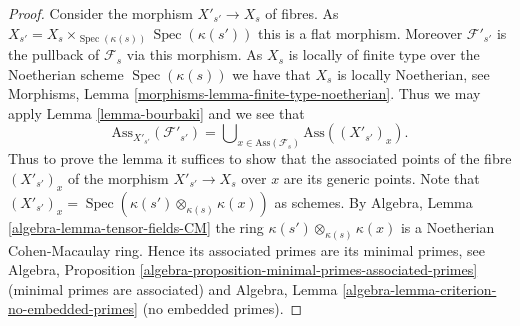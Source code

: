 \documentclass[10pt,a4paper]{amsart}
\theoremstyle{plain}
\theoremstyle{definition}
\theoremstyle{remark}
\numberwithin{equation}{subsection}
\def\Spec{\mathop{\mathrm{Spec}}}
\begin{document}
\begin{proof}
Consider the morphism $X'_{s'} \to X_s$ of fibres. As
$X_{s'} = X_s \times_{\Spec(\kappa(s))} \Spec(\kappa(s'))$
this is a flat morphism. Moreover $\mathcal{F}'_{s'}$ is the pullback
of $\mathcal{F}_s$ via this morphism. As $X_s$ is locally of finite
type over the Noetherian scheme $\Spec(\kappa(s))$ we have that
$X_s$ is locally Noetherian, see
Morphisms, Lemma \ref{morphisms-lemma-finite-type-noetherian}.
Thus we may apply
Lemma \ref{lemma-bourbaki}
and we see that
$$
\text{Ass}_{X'_{s'}}(\mathcal{F}'_{s'}) =
\bigcup\nolimits_{x \in \text{Ass}(\mathcal{F}_s)} \text{Ass}((X'_{s'})_x).
$$
Thus to prove the lemma it suffices to show that the associated points
of the fibre $(X'_{s'})_x$ of the morphism $X'_{s'} \to X_s$ over $x$
are its generic points. Note that
$(X'_{s'})_x = \Spec(\kappa(s') \otimes_{\kappa(s)} \kappa(x))$
as schemes. By
Algebra, Lemma \ref{algebra-lemma-tensor-fields-CM}
the ring $\kappa(s') \otimes_{\kappa(s)} \kappa(x)$ is a Noetherian
Cohen-Macaulay ring. Hence its associated primes are its minimal primes, see
Algebra, Proposition \ref{algebra-proposition-minimal-primes-associated-primes}
(minimal primes are associated) and
Algebra, Lemma \ref{algebra-lemma-criterion-no-embedded-primes}
(no embedded primes).
\end{proof}
\end{document}
